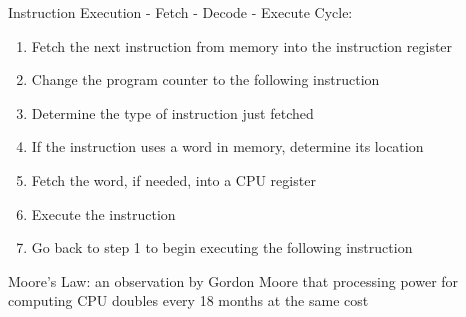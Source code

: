 \documentclass[12pt]{article}
\begin{document}
Instruction Execution - Fetch - Decode - Execute Cycle: \begin{enumerate} 
\item Fetch the next instruction from memory into the instruction register 
\item Change the program counter to the following instruction 
\item Determine the type of instruction just fetched 
\item If the instruction uses a word in memory, determine its location 
\item Fetch the word, if needed, into a CPU register 
\item Execute the instruction 
\item Go back to step 1 to begin executing the following instruction \end{enumerate} 
\begin{definition} Moore's Law: an observation by Gordon Moore that processing power for computing CPU doubles every 18 months at the same cost \end{definition}
\end{document}
